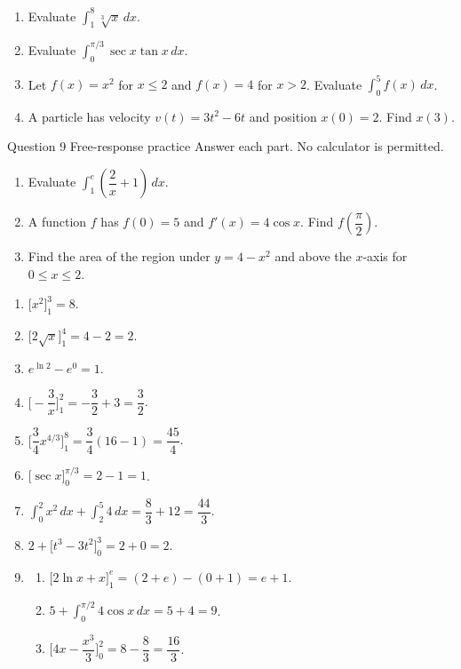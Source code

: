 \documentclass[11pt]{article}
\begin{document}
\begin{enumerate}[leftmargin=*,itemsep=2pt,start=5]
  \item Evaluate $\displaystyle\int_{1}^{8}\sqrt[3]{x}\,dx$.\work{2.8cm}
  \item Evaluate $\displaystyle\int_{0}^{\pi/3}\sec x\tan x\,dx$.\work{2.8cm}
  \item Let $f(x)=x^2$ for $x\le2$ and $f(x)=4$ for $x>2$. Evaluate $\displaystyle\int_{0}^{5}f(x)\,dx$.\work{2.8cm}
  \item A particle has velocity $v(t)=3t^2-6t$ and position $x(0)=2$. Find $x(3)$.\work{2.8cm}
\end{enumerate}

\begin{frbox}{Question 9 \textperiodcentered{} Free-response practice}
Answer each part. No calculator is permitted.
\begin{enumerate}[label=(\alph*),leftmargin=*,itemsep=2pt]
  \item Evaluate $\displaystyle\int_{1}^{e}\left(\dfrac2x+1\right)\,dx$.\work{2.6cm}
  \item A function $f$ has $f(0)=5$ and $f'(x)=4\cos x$. Find $f\!\left(\dfrac\pi2\right)$.\work{2.6cm}
  \item Find the area of the region under $y=4-x^2$ and above the $x$-axis for $0\le x\le2$.\work{2.6cm}
\end{enumerate}
\end{frbox}

\newpage
\begin{solbox}
\begin{enumerate}[leftmargin=*,itemsep=4pt]
  \item $\Big[x^2\Big]_1^3=8$.
  \item $\Big[2\sqrt x\Big]_1^4=4-2=2$.
  \item $e^{\ln2}-e^0=1$.
  \item $\Big[-\dfrac3x\Big]_1^2=-\dfrac32+3=\dfrac32$.
  \item $\Big[\dfrac34x^{4/3}\Big]_1^8=\dfrac34(16-1)=\dfrac{45}{4}$.
  \item $\Big[\sec x\Big]_0^{\pi/3}=2-1=1$.
  \item $\displaystyle\int_{0}^{2}x^2\,dx+\displaystyle\int_{2}^{5}4\,dx=\dfrac83+12=\dfrac{44}{3}$.
  \item $2+\Big[t^3-3t^2\Big]_0^3=2+0=2$.
  \item \begin{enumerate}[label=(\alph*),leftmargin=*,itemsep=3pt]
    \item $\Big[2\ln x+x\Big]_1^e=(2+e)-(0+1)=e+1$.
    \item $5+\displaystyle\int_{0}^{\pi/2}4\cos x\,dx=5+4=9$.
    \item $\Big[4x-\dfrac{x^3}{3}\Big]_0^2=8-\dfrac83=\dfrac{16}{3}$.
  \end{enumerate}
\end{enumerate}
\end{solbox}
\end{document}
